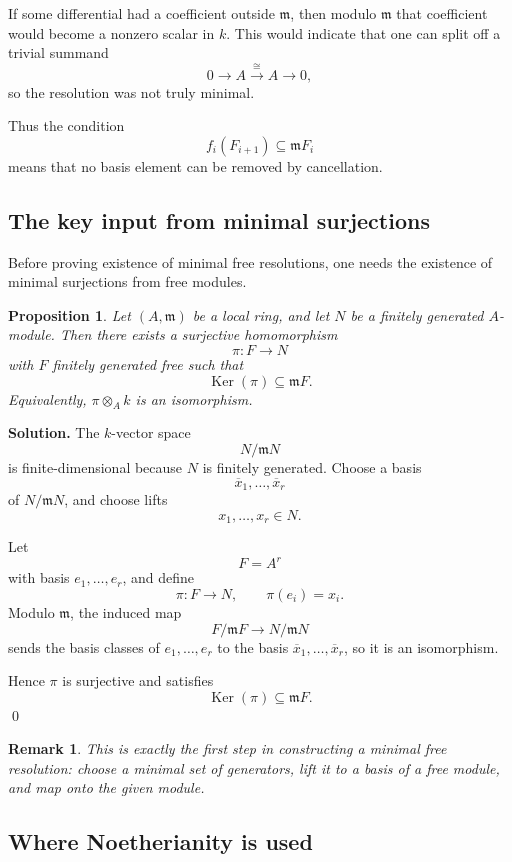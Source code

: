 \documentclass[12pt,a4paper]{article}
\theoremstyle{notespace}
\newtheorem{remark}{Remark}[section]
\DeclareMathOperator{\Ker}{Ker}
\newtheorem{proposition}[definition]{Proposition}
\newcommand{\m}{\mathfrak m}
\begin{document}
If some differential had a coefficient outside \(\m\), then modulo \(\m\) that coefficient would become a nonzero scalar in \(k\). This would indicate that one can split off a trivial summand
\[
0\to A \xrightarrow{\cong} A \to 0,
\]
so the resolution was not truly minimal.

Thus the condition
\[
f_i(F_{i+1})\subseteq \m F_i
\]
means that no basis element can be removed by cancellation.

\subsection{The key input from minimal surjections}

Before proving existence of minimal free resolutions, one needs the existence of minimal surjections from free modules.

\begin{proposition}
	Let \((A,\m)\) be a local ring, and let \(N\) be a finitely generated \(A\)-module. Then there exists a surjective homomorphism
	\[
	\pi:F\to N
	\]
	with \(F\) finitely generated free such that
	\[
	\Ker(\pi)\subseteq \m F.
	\]
	Equivalently, \(\pi\otimes_A k\) is an isomorphism.
\end{proposition}

\textbf{Solution.}
The \(k\)-vector space
\[
N/\m N
\]
is finite-dimensional because \(N\) is finitely generated. Choose a basis
\[
\overline{x}_1,\dots,\overline{x}_r
\]
of \(N/\m N\), and choose lifts
\[
x_1,\dots,x_r\in N.
\]

Let
\[
F=A^r
\]
with basis \(e_1,\dots,e_r\), and define
\[
\pi:F\to N,\qquad \pi(e_i)=x_i.
\]
Modulo \(\m\), the induced map
\[
F/\m F \to N/\m N
\]
sends the basis classes of \(e_1,\dots,e_r\) to the basis \(\overline{x}_1,\dots,\overline{x}_r\), so it is an isomorphism.

Hence \(\pi\) is surjective and satisfies
\[
\Ker(\pi)\subseteq \m F.
\]
\qed

\begin{remark}
	This is exactly the first step in constructing a minimal free resolution: choose a minimal set of generators, lift it to a basis of a free module, and map onto the given module.
\end{remark}

\subsection{Where Noetherianity is used}
\end{document}
